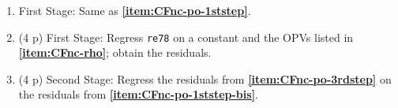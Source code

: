 \documentclass[
]{article}
\newenvironment{Shaded}{\begin{snugshade}}{\end{snugshade}}
\newcommand{\AttributeTok}[1]{\textcolor[rgb]{0.13,0.29,0.53}{#1}}
\newcommand{\CommentTok}[1]{\textcolor[rgb]{0.56,0.35,0.01}{\textit{#1}}}
\newcommand{\FunctionTok}[1]{\textcolor[rgb]{0.13,0.29,0.53}{\textbf{#1}}}
\newcommand{\NormalTok}[1]{#1}
\newcommand{\OtherTok}[1]{\textcolor[rgb]{0.56,0.35,0.01}{#1}}
\newcommand{\SpecialCharTok}[1]{\textcolor[rgb]{0.81,0.36,0.00}{\textbf{#1}}}
\begin{document}
\begin{enumerate}
\begin{enumerate}
    \begin{enumerate}
    \def\labelenumiii{\roman{enumiii}.}
    \item
      First Stage: Same as
      \textbf{\ref{item:CFnc-po-1ststep}}.\label{item:CFnc-po-1ststep-bis}
    \item
      (4 p) First Stage: Regress \texttt{re78} on a constant and the
      OPVs listed in \textbf{\textbf{\ref{item:CFnc-rho}}}; obtain the
      residuals.\label{item:CFnc-po-3rdstep}

\begin{Shaded}
\end{Shaded}
    \item
      (4 p) Second Stage: Regress the residuals from
      \textbf{\ref{item:CFnc-po-3rdstep}} on the residuals from
      \textbf{\ref{item:CFnc-po-1ststep-bis}}.\label{item:CFnc-po-4thstep}


\end{enumerate}
\end{enumerate}
\end{enumerate}
\end{document}
